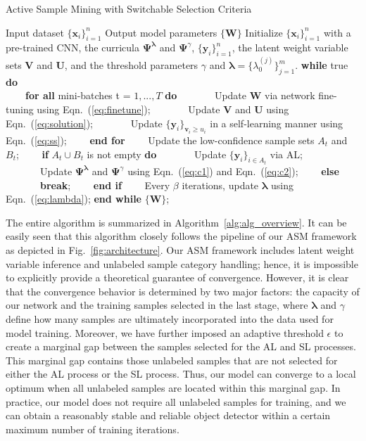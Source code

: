\documentclass[journal]{IEEEtran}
\begin{document}
{\begin{algorithm}[t]
\caption{{Active Sample Mining with Switchable Selection Criteria}}
\label{alg:alg_overview}
\begin{algorithmic}[1]
\REQUIRE Input dataset $\{\mathbf{x}_{i}\}_{i=1}^{n}$
\ENSURE Output model parameters $\{\mathbf{W}\}$
\STATE Initialize $\{\mathbf{x}_{i}\}_{i=1}^{n}$ with a pre-trained CNN, the curricula $\mathbf{ \Psi}^{\bm \lambda}$ and $\mathbf{\Psi}^{\gamma}$, $\{\mathbf{y}_{i}\}_{i=1}^{n}$, the latent weight variable sets $\mathbf{V}$ and $\mathbf{U}$, and the threshold parameters $\gamma$ and ${\bm \lambda}=\{\lambda^{(j)}_0\}_{j=1}^m$.
\STATE
\textbf{while} true \textbf{do} \\
\STATE \ \ \ \ \textbf{for all} mini-batches t = $1,...,T$ \textbf{do}
\STATE \ \ \ \ \ \ \ Update $\mathbf{W}$ via network fine-tuning using Eqn.~(\ref{eq:finetune});
\STATE \ \ \ \ \ \ \ Update $\mathbf{V}$ and $\mathbf{U}$ using Eqn.~(\ref{eq:solution});
\STATE \ \ \ \ \ \ \ Update $\{\mathbf{y}_i\}_{\mathbf{v}_i \ge u_i}$ in a self-learning manner using Eqn.~(\ref{eq:ss});
\STATE \ \ \ \ \textbf{end for}
\STATE \ \ \ \ Update the low-confidence sample sets $A_t$ and $B_t$;
\STATE \ \ \ \ \textbf{if} $A_t \cup B_t$ is not empty \textbf{do}
\STATE \ \ \ \ \ \ \ Update $\{\mathbf{y}_i\}_{i \in A_t}$ via AL;
\STATE \ \ \ \ \ \ \ Update $\mathbf{ \Psi}^{\bm \lambda}$ and $\mathbf{\Psi}^{\gamma}$ using Eqn.~(\ref{eq:c1}) and Eqn.~(\ref{eq:c2});
\STATE \ \ \ \ \textbf{else}
\STATE \ \ \ \ \ \ \ \textbf{break};
\STATE \ \ \ \ \textbf{end if}
\STATE \ \ \ \ Every $\beta$ iterations, update ${\bm \lambda}$ using Eqn.~(\ref{eq:lambda});
\STATE\textbf{end while}
\RETURN $\{\mathbf{W}\}$;
\end{algorithmic}
\end{algorithm}
The entire algorithm {is} summarized in Algorithm~\ref{alg:alg_overview}. It can be easily seen that this algorithm closely follows the pipeline of our {ASM} framework as depicted in Fig.~\ref{fig:architecture}. {Our {ASM} framework includes latent weight variable inference and unlabeled sample category handling; hence, it is impossible to explicitly provide a theoretical guarantee of convergence. However, it is clear that the convergence behavior is determined by two major factors: the capacity of our network and the training samples selected in the last stage, where $\bm \lambda$ and $\gamma$ define how many samples are ultimately incorporated into the data used for model training. Moreover, we have further imposed an adaptive threshold $\epsilon$ to create a marginal gap between the samples selected for the AL and SL processes. This marginal gap contains those unlabeled samples that are not selected for either the AL process or the SL process. Thus, our model can converge to a local optimum when all unlabeled samples are located within this marginal gap. In practice, our model does not require all unlabeled samples for training, and we can obtain a reasonably stable and reliable object detector within a certain maximum number of training iterations.}



}
\end{document}
